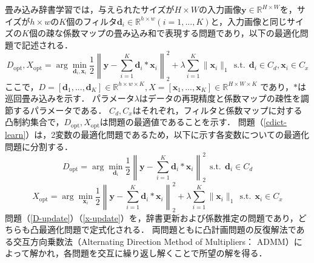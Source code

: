 畳み込み辞書学習では，与えられたサイズが$H\times W$の入力画像$\bm y\in\mathbb{R}^{H\times W}$を，サイズが$h\times w$の$K$個のフィルタ$\bm d_i\in\mathbb{R}^{h\times w}(i=1,...,K)$と，入力画像と同じサイズの$K$個の疎な係数マップの畳み込み和で表現する問題であり，以下の最適化問題で記述される．
\begin{equation}
	D_{\text{opt}},X_{\text{opt}}=\arg\min_{\bm d_i,\bm x_i}\frac{1}{2}\left\|\bm y-\sum_{i=1}^{K}\bm d_i*\bm x_i\right\|_2^2+\lambda\sum_{i=1}^{K}\|\bm x_i\|_1~~\text{s.t.}~~\bm d_i\in C_d,\bm x_i\in C_x
	\label{cdict-learn}
\end{equation}
ここで，$D=[\bm d_1, ..., \bm d_K]\in\mathbb{R}^{h\times w\times K}, X=[\bm x_1,...,\bm x_K]\in\mathbb{R}^{H\times W\times K}$ であり，$*$は巡回畳み込みを示す．
パラメータ$\lambda$はデータの再現精度と係数マップの疎性を調節するパラメータである．
$C_d, C_x$はそれぞれ，フィルタと係数マップに対する凸制約集合で，$D_{\text{opt}},X_{\text{opt}}$は問題の最適値であることを示す．
問題（\ref{cdict-learn}）は，2変数の最適化問題であるため，以下に示す各変数についての最適化問題に分割する．
\begin{equation}
	D_{\text{opt}} = \arg\min_{\bm d_i}\frac{1}{2}\left\|\bm y-\sum_{i=1}^{K}\bm d_i*\bm x_i\right\|_2^2~~\text{s.t.}~~\bm d_i\in C_d
	\label{D-update}
\end{equation}
\begin{equation}
	X_{\text{opt}}=\arg\min_{\bm x_i}\frac{1}{2}\left\|\bm y-\sum_{i=1}^{K}\bm d_i*\bm x_i\right\|_2^2+\lambda\sum_{i=1}^{K}\|\bm x_i\|_1~~\text{s.t.}~~\bm x_i\in C_x
\label{x-update}
\end{equation}
問題（\ref{D-update}）（\ref{x-update}）を，辞書更新および係数推定の問題であり，どちらも凸最適化問題で定式化される．
両問題ともに凸計画問題の反復解法である交互方向乗数法（Alternating Direction Method of Multipliers： ADMM）\cite{admm}によって解かれ，各問題を交互に繰り返し解くことで所望の解を得る．